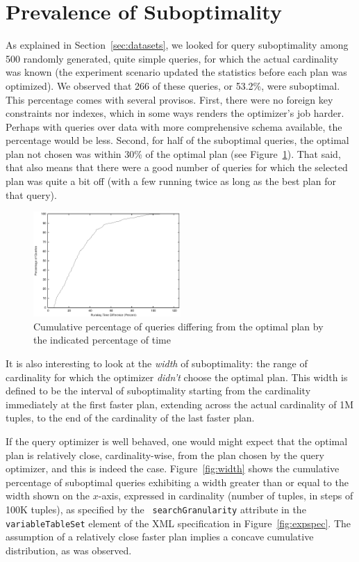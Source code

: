 \section{Prevalence of Suboptimality}
As explained in Section~\ref{sec:datasets}, we looked
for query suboptimality among 500 randomly generated, quite simple queries,
for which the actual cardinality was known (the experiment scenario updated
the statistics before each plan was optimized). We observed that 266 of
these queries, or 53.2\%, were suboptimal.  This percentage comes with several
provisos. First, there were no foreign key constraints nor indexes, which in
some ways renders the optimizer's job harder.  Perhaps with
queries over data with more comprehensive schema available, the percentage
would be less. Second, for half of the suboptimal queries, the optimal plan
not chosen was within 30\% of the optimal plan (see
Figure~\ref{fig:time}). That said, that also means that there were a good
number of queries for which the selected plan was quite a bit off (with a
few running twice as long as the best plan for that query).

\begin{figure}[bth]\centering
\includegraphics[width=0.50\textwidth]{figures/runtime_diff.eps}
\caption{Cumulative percentage of queries differing from the optimal plan by
  the indicated percentage of time\label{fig:time}}
\end{figure}

It is also interesting to look at the {\em width} of suboptimality: the
range of cardinality for which the optimizer {\em didn't} choose the optimal
plan. This width is defined to be the interval
of suboptimality starting from the cardinality immediately at the first
faster plan, extending across the actual cardinality of 1M tuples, to the
end of the cardinality of the last faster plan.

If the query optimizer is well behaved, one would might expect that the
optimal plan is relatively close, cardinality-wise, from the plan chosen by
the query optimizer, and this is indeed the case. Figure~\ref{fig:width} shows
the cumulative percentage of suboptimal queries exhibiting a width greater
than or equal to the width shown on the $x$-axis, expressed in cardinality
(number of tuples, in steps of 100K tuples), as specified by the {\tt
  searchGranularity} attribute in the {\tt variable\-TableSet} element of the
XML specification in Figure~\ref{fig:expspec}. The assumption of a
relatively close faster plan implies a concave cumulative distribution, as
was observed.

